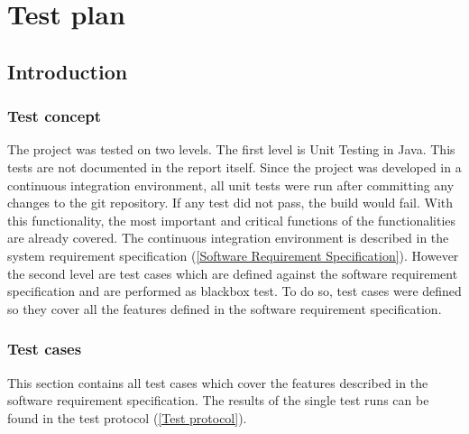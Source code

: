 
\chapter{Test plan} %

\label{Test plan} %



\section{Introduction}


\subsection{Test concept}

The project was tested on two levels. The first level is Unit Testing in Java. This tests are not documented in the report itself. Since the project was developed in a continuous integration environment, all unit tests were run after committing any changes to the git repository. If any test did not pass, the build would fail. With this functionality, the most important and critical functions of the functionalities are already covered. The continuous integration environment is described in the system requirement specification (\ref{Software Requirement Specification}). \linebreak 
However the second level are test cases which are defined against the software requirement specification and are performed as blackbox test.  To do so, test cases were defined so they cover all the features defined in the software requirement specification. 

\subsection{Test cases}

This section contains all test cases which cover the features described in the software requirement specification. The results of the single test runs can be found in the test protocol (\ref{Test protocol}).


